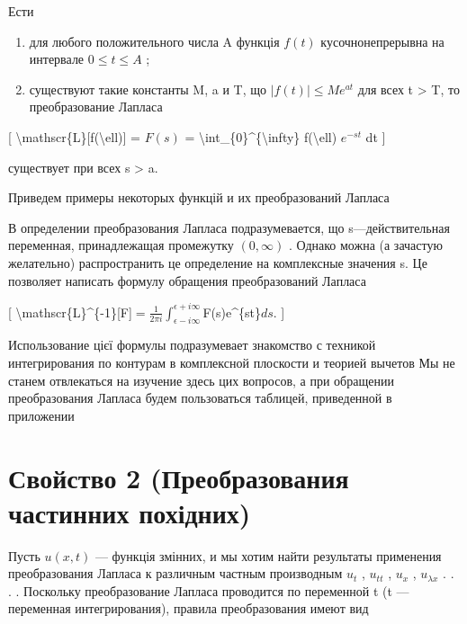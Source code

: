 \documentclass[
]{article}
\begin{document}
{{Ести

\begin{enumerate}
\def\labelenumi{\arabic{enumi})}
\item
  для любого положительного числа A функція \(f(t)\) кусочнонепрерывна
  на интервале \(0 \le t \le A\) ;
\item
  существуют такие константы M, a и T, що \(|f(t)| \leq Me^{at}\) для
  всех t \textgreater{} T, то преобразование Лапласа
\end{enumerate}

{[} \textbackslash mathscr\{L\}{[}f(\textbackslash ell){]} = \(F(s)\) =
\textbackslash int\_\{0\}\^{}\{\textbackslash infty\}
f(\textbackslash ell) \(e^{-st}\) dt {]}

существует при всех s \textgreater{} a.

Приведем примеры некоторых функцій и их преобразований Лапласа

В определении преобразования Лапласа подразумевается, що
s---действительная переменная, принадлежащая промежутку \((0, \infty)\)
. Однако можна (а зачастую желательно) распространить це определение на
комплексные значения s. Це позволяет написать формулу обращения
преобразований Лапласа

{[}
\textbackslash mathscr\{L\}\^{}\{-1\}{[}F{]}\(= \frac{1}{2\pi i} \int_{\epsilon - i\infty}^{\epsilon + i\infty}\)F(s)e\^{}\{st\}\(ds\).
{]}

Использование цієї формулы подразумевает знакомство с техникой
интегрирования по контурам в комплексной плоскости и теорией вычетов Мы
не станем отвлекаться на изучение здесь цих вопросов, а при обращении
преобразования Лапласа будем пользоваться таблицей, приведенной в
приложении

\section{Свойство 2 (Преобразования частинних
похідних)}\label{ux441ux432ux43eux439ux441ux442ux432ux43e-2-ux43fux440ux435ux43eux431ux440ux430ux437ux43eux432ux430ux43dux438ux44f-ux447ux430ux441ux442ux438ux43dux43dux438ux445-ux43fux43eux445ux456ux434ux43dux438ux445}

Пусть \(u(x, t)\) --- функція змінних, и мы хотим найти результаты
применения преобразования Лапласа к различным частным производным
\(u_t\) , \(u_{tt}\) , \(u_x\) , \(u_{\lambda x}\) . . . . Поскольку
преобразование Лапласа проводится по переменной t (t --- переменная
интегрирования), правила преобразования имеют вид

}}
\end{document}
